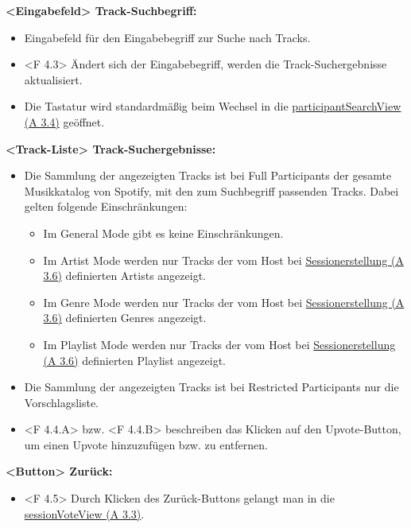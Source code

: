 \documentclass[oneside, ngerman]{sdqtechreport}
\begin{document}
\textbf{<Eingabefeld> Track-Suchbegriff:}
\begin{itemize}
    \item Eingabefeld für den Eingabebegriff zur Suche nach Tracks.
    \hypertarget{<F 4.3>}{}
    \item <F 4.3> Ändert sich der Eingabebegriff, werden die Track-Suchergebnisse aktualisiert.
    \item Die Tastatur wird standardmäßig beim Wechsel in die \hyperlink{participantSearchView}{participantSearchView (A 3.4)} geöffnet.
\end{itemize}

\textbf{<Track-Liste> Track-Suchergebnisse:}
\begin{itemize}
    \item Die Sammlung der angezeigten Tracks ist bei Full Participants der gesamte Musikkatalog von Spotify, mit den zum Suchbegriff passenden Tracks. Dabei gelten folgende Einschränkungen:
    \begin{itemize}
        \item Im General Mode gibt es keine Einschränkungen.
        \item Im Artist Mode werden nur Tracks der vom Host bei \hyperlink{hostModeSettingsView}{Sessionerstellung (A 3.6)} definierten Artists angezeigt.
        \item Im Genre Mode werden nur Tracks der vom Host bei \hyperlink{hostModeSettingsView}{Sessionerstellung (A 3.6)} definierten Genres angezeigt.
        \item Im Playlist Mode werden nur Tracks der vom Host bei \hyperlink{hostModeSettingsView}{Sessionerstellung (A 3.6)} definierten Playlist angezeigt.
    \end{itemize}
    \item Die Sammlung der angezeigten Tracks ist bei Restricted Participants nur die Vorschlagsliste.
    \hypertarget{<F 4.4.A>}{}
    \hypertarget{<F 4.4.B>}{}
    \item <F 4.4.A> bzw. <F 4.4.B> beschreiben das Klicken auf den Upvote-Button, um einen Upvote hinzuzufügen bzw. zu entfernen.
\end{itemize}

\textbf{<Button> Zurück:}
\begin{itemize}
    \hypertarget{<F 4.5>}{}
    \item <F 4.5> Durch Klicken des Zurück-Buttons gelangt man in die  \hyperlink{sessionVoteView}{sessionVoteView (A 3.3)}.
\end{itemize}
\end{document}
